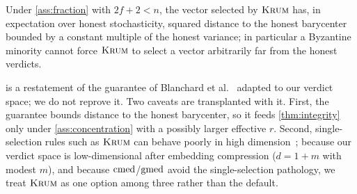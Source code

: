\begin{lemma}
\label{lem:krum}
Under \cref{ass:fraction} with $2f{+}2<n$, the vector selected by $\textsc{Krum}$ has, in
expectation over honest stochasticity, squared distance to the honest barycenter bounded
by a constant multiple of the honest variance; in particular a Byzantine minority cannot
force $\textsc{Krum}$ to select a vector arbitrarily far from the honest verdicts.
\end{lemma}
\begin{remark}
 is a restatement of the guarantee of Blanchard et
al.~\cite{blanchard2017krum} adapted to our verdict space; we do not reprove it. Two
caveats are transplanted with it. First, the guarantee bounds distance to the honest
barycenter, so it feeds \cref{thm:integrity} only under \cref{ass:concentration} with a
possibly larger effective $r$. Second, single-selection rules such as $\textsc{Krum}$ can behave
poorly in high dimension~\cite{mhamdi2018bulyan}; because our verdict space is
low-dimensional after embedding compression ($d=1+m$ with modest $m$), and because
$\operatorname{cmed}$/$\operatorname{gmed}$ avoid the single-selection pathology, we treat $\textsc{Krum}$ as one option among
three rather than the default.
\end{remark}

